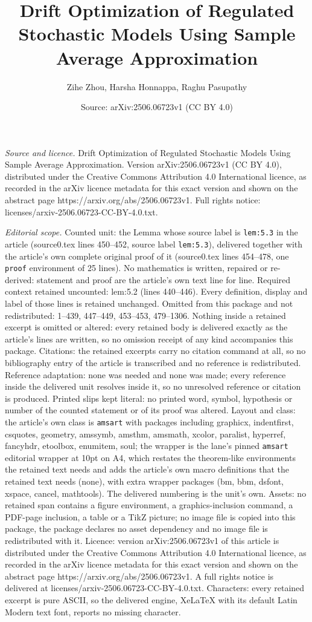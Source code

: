 \documentclass[10pt,a4paper]{amsart}
\title[Drift Optimization of Regulated Stochastic Models Using Samp]{Drift Optimization of Regulated Stochastic Models Using Sample Average Approximation}
\author{Zihe Zhou, Harsha Honnappa, Raghu Pasupathy}
\date{Source: arXiv:2506.06723v1 (CC BY 4.0)}
\begin{document}
\maketitle

\noindent\emph{Source and licence.} Drift Optimization of Regulated Stochastic Models Using Sample Average Approximation. Version arXiv:2506.06723v1 (CC BY 4.0), distributed under the Creative Commons Attribution 4.0 International licence, as recorded in the arXiv licence metadata for this exact version and shown on the abstract page https://arxiv.org/abs/2506.06723v1. Full rights notice: licenses/arxiv-2506.06723-CC-BY-4.0.txt.\par\smallskip

\noindent\textit{Editorial scope.} Counted unit: the Lemma whose source label is \texttt{lem:5.3} in the article (source0.tex lines 450--452, source label \texttt{lem:5.3}), delivered together with the article's own complete original proof of it (source0.tex lines 454--478, one \texttt{proof} environment of 25 lines). No mathematics is written, repaired or re-derived: statement and proof are the article's own text line for line. Required context retained uncounted: lem:5.2 (lines 440--446). Every definition, display and label of those lines is retained unchanged. Omitted from this package and not redistributed: 1--439, 447--449, 453--453, 479--1306. Nothing inside a retained excerpt is omitted or altered: every retained body is delivered exactly as the article's lines are written, so no omission receipt of any kind accompanies this package. Citations: the retained excerpts carry no citation command at all, so no bibliography entry of the article is transcribed and no reference is redistributed. Reference adaptation: none was needed and none was made; every reference inside the delivered unit resolves inside it, so no unresolved reference or citation is produced. Printed slips kept literal: no printed word, symbol, hypothesis or number of the counted statement or of its proof was altered. Layout and class: the article's own class is \texttt{amsart} with packages including graphicx, indentfirst, csquotes, geometry, amssymb, amsthm, amsmath, xcolor, paralist, hyperref, fancyhdr, etoolbox, enumitem, soul; the wrapper is the lane's pinned \texttt{amsart} editorial wrapper at 10pt on A4, which restates the theorem-like environments the retained text needs and adds the article's own macro definitions that the retained text needs (none), with extra wrapper packages (bm, bbm, dsfont, xspace, cancel, mathtools). The delivered numbering is the unit's own. Assets: no retained span contains a figure environment, a graphics-inclusion command, a PDF-page inclusion, a table or a TikZ picture; no image file is copied into this package, the package declares no asset dependency and no image file is redistributed with it. Licence: version arXiv:2506.06723v1 of this article is distributed under the Creative Commons Attribution 4.0 International licence, as recorded in the arXiv licence metadata for this exact version and shown on the abstract page https://arxiv.org/abs/2506.06723v1. A full rights notice is delivered at licenses/arxiv-2506.06723-CC-BY-4.0.txt. Characters: every retained excerpt is pure ASCII, so the delivered engine, XeLaTeX with its default Latin Modern text font, reports no missing character.
\end{document}
